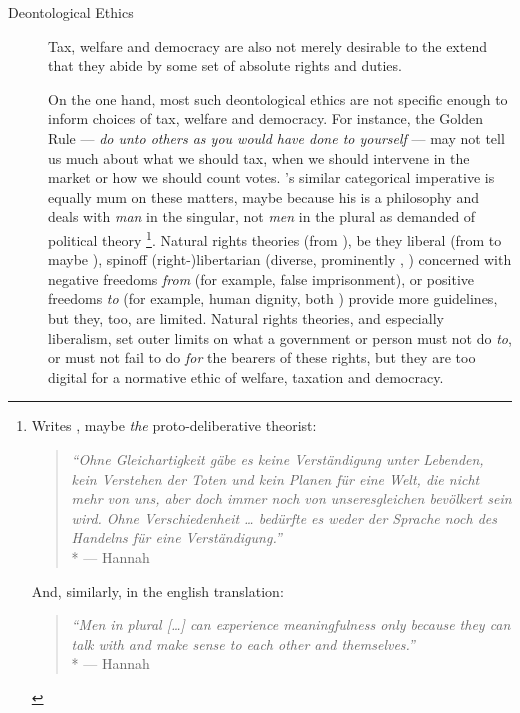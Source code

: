 \begin{description}
	\item[Deontological Ethics \label{itm:deontological}]
	Tax, welfare and democracy are also not merely desirable to the extend that they abide by some set of absolute rights and duties.

	On the one hand, most such deontological ethics are not specific enough to inform choices of tax, welfare and democracy.
	For instance, the Golden Rule --- \emph{do unto others as you would have done to yourself} --- may not tell us much about what we should tax, when we should intervene in the market or how we should count votes.
	\citeauthor{Kant1781}'s similar categorical imperative is equally mum on these matters, maybe because his is a philosophy and %
	deals with \emph{man} in the singular, not \emph{men} in the plural as \citeauthor{Arendt1958} demanded of political theory
	\footnote{
		Writes \citeauthor{Arendt1958}, maybe \emph{the} proto-deliberative theorist:
		\begin{quote}
			\emph{``Ohne Gleichartigkeit g\"abe es keine Verst\"andigung unter Lebenden, kein Verstehen der Toten und kein Planen f\"ur eine Welt, die nicht mehr von uns, aber doch immer noch von unseresgleichen bev\"olkert sein wird. Ohne Verschiedenheit … bed\"urfte es weder der Sprache noch des Handelns für eine Verst\"andigung.''}\\*
			--- Hannah \citet{Arendt1958} %
		\end{quote}
		And, similarly, in the english translation:
		\begin{quote}
			\emph{``Men in plural [\ldots] can experience meaningfulness only because they can talk with and make sense to each other and themselves.''}\\*
			--- Hannah \citet[Prologue]{Arendt1958} %
		\end{quote}
	}.
	Natural rights theories (from \citeauthor{Grotius1625}), be they liberal (from \citealt{Locke1689a} to maybe \citealt{Rawls-1993-aa}), spinoff (right-)libertarian (diverse, prominently \citealt{Hayek1944}, \citealt{Nozick1974}) concerned with negative freedoms \emph{from} (for example, false imprisonment), or positive freedoms \emph{to} (for example, human dignity, both \citealt{Berlin1969}) provide more guidelines, but they, too, are limited.
	Natural rights theories, and especially liberalism, set outer limits on what a government or person must not do \emph{to}, or must not fail to do \emph{for} the bearers of these rights, but they are too digital for a normative ethic of welfare, taxation and democracy.

\end{description}
